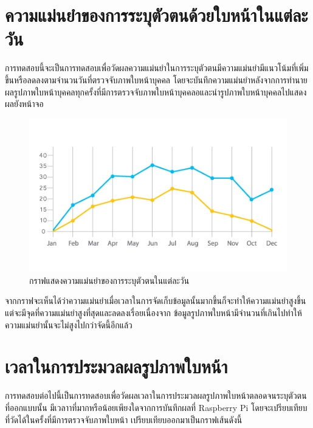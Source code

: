 \section{ความแม่นยำของการระบุตัวตนด้วยใบหน้าในแต่ละวัน}
การทดสอบนี้จะเป็นการทดสอบเพื่อวัดผลความแม่นยำในการระบุตัวตนมีความแม่นยำมีแนวโน้มที่เพิ่มขึ้นหรือลดลงตามจำนวนวันที่ตรวจจับภาพใบหน้าบุคคล
โดยจะบันทึกความแม่นยำหลังจากการทำนายผลรูปภาพใบหน้าบุคคลทุกครั้งที่มีการตรวจจับภาพใบหน้าบุคคลอและนำรูปภาพใบหน้าบุคคลไปแสดงผลยังหน้าจอ

\begin{figure}[!ht]
    \begin{center}
      \includegraphics[scale=.6]{pic/graph_acc.jpg}
      \caption[กราฟแสดงความแม่นยำของการระบุตัวตนในแต่ละวัน]{กราฟแสดงความแม่นยำของการระบุตัวตนในแต่ละวัน}
      \label{fig:face_graph}
    \end{center}
  \end{figure}

\indent จากกราฟจะเห็นได้ว่าความแม่นยำเมื่อเวลาในการจัดเก็บข้อมูลนั้นมากขึ้นก็จะทำให้ความแม่นยำสูงขึ้น แต่จะมีจุดที่ความแม่นยำสูงที่สุดและลดลงเรื่อยเนื่องจาก
ข้อมูลรูปภาพใบหน้ามีจำนวนที่เกินไปทำให้ความแม่นยำนั้นจะไม่สูงไปกว่าจัดนี้อีกแล้ว

\section{เวลาในการประมวลผลรูปภาพใบหน้า}
การทดสอบต่อไปนี้เป็นการทดสอบเพื่อวัดผลเวลาในการประมวลผลรูปภาพใบหน้าตลอดจนระบุตัวตนที่ออกแบบนั้น
มีเวลาาที่มากหรือน้อยเพียงใดจากการบันทึกผลที่ Raspberry Pi โดยจะเปรียบเทียบที่วัดได้ในครั้งที่มีการตรวจจับภาพใบหน้า
เปรียบเทียบออกมาเป็นกราฟเส้นดังนี้
  
